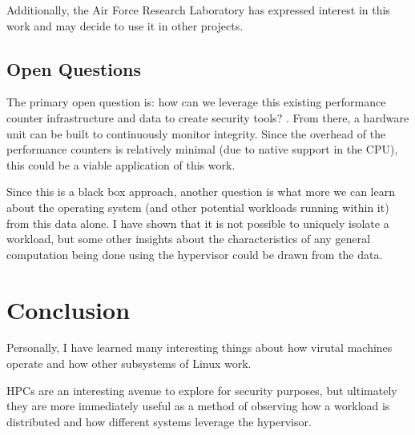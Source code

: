\documentclass[notitlepage]{article}
\begin{document}
Additionally, the Air Force Research Laboratory has expressed interest in this
work and may decide to use it in other projects.

\subsection{Open Questions}
The primary open question is: how can we leverage this existing performance
counter infrastructure and data to create security tools? . From there, a
hardware unit can be built to continuously monitor integrity. Since the overhead
of the performance counters is relatively minimal (due to native support in the
CPU), this could be a viable application of this work.

Since this is a black box approach, another question is what more we can learn
about the operating system (and other potential workloads running within it)
from this data alone. I have shown that it is not possible to uniquely isolate a
workload, but some other insights about the characteristics of any general
computation being done using the hypervisor could be drawn from the data.

\section{Conclusion}
\label{sec:conclusion}
Personally, I have learned many interesting things about how virutal machines
operate and how other subsystems of Linux work.

HPCs are an interesting avenue to explore for security purposes, but ultimately
they are more immediately useful as a method of observing how a workload is
distributed and how different systems leverage the hypervisor.


\newpage

\nocite{*}

{}

\end{document}
